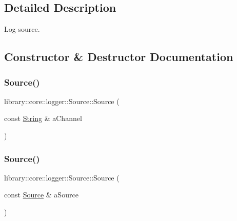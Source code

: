 \subsection{Detailed Description}
Log source. 

\subsection{Constructor \& Destructor Documentation}
\mbox{\label{classlibrary_1_1core_1_1logger_1_1Source_a2e40fbdae5f8f4dd6a075992f11a939f}} 
\subsubsection{\texorpdfstring{Source()}{Source()}\hspace{0.1cm}{\footnotesize\ttfamily [1/2]}}
{\footnotesize\ttfamily library\+::core\+::logger\+::\+Source\+::\+Source (\begin{DoxyParamCaption}\item[{const \hyperlink{classlibrary_1_1core_1_1types_1_1String}{String} \&}]{a\+Channel }\end{DoxyParamCaption})}

\mbox{\label{classlibrary_1_1core_1_1logger_1_1Source_ae9d7e82827aa19efdd1c25d91911a9a6}} 
\subsubsection{\texorpdfstring{Source()}{Source()}\hspace{0.1cm}{\footnotesize\ttfamily [2/2]}}
{\footnotesize\ttfamily library\+::core\+::logger\+::\+Source\+::\+Source (\begin{DoxyParamCaption}\item[{const \hyperlink{classlibrary_1_1core_1_1logger_1_1Source}{Source} \&}]{a\+Source }\end{DoxyParamCaption})}



